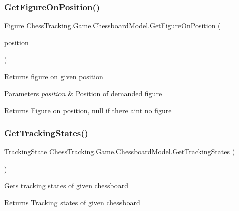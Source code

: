 \subsubsection{\texorpdfstring{GetFigureOnPosition()}{GetFigureOnPosition()}}
{\footnotesize\ttfamily \mbox{\hyperlink{class_chess_tracking_1_1_game_1_1_figure}{Figure}} Chess\+Tracking.\+Game.\+Chessboard\+Model.\+Get\+Figure\+On\+Position (\begin{DoxyParamCaption}\item[{\mbox{\hyperlink{class_chess_tracking_1_1_game_1_1_chess_position}{Chess\+Position}}}]{position }\end{DoxyParamCaption})}



Returns figure on given position 


\begin{DoxyParams}{Parameters}
{\em position} & Position of demanded figure\\
\hline
\end{DoxyParams}
\begin{DoxyReturn}{Returns}
\mbox{\hyperlink{class_chess_tracking_1_1_game_1_1_figure}{Figure}} on position, null if there ain\textquotesingle{}t no figure
\end{DoxyReturn}
\mbox{\label{class_chess_tracking_1_1_game_1_1_chessboard_model_a7dba1550cc252450505f388ad10ebffd}} 
\subsubsection{\texorpdfstring{GetTrackingStates()}{GetTrackingStates()}}
{\footnotesize\ttfamily \mbox{\hyperlink{class_chess_tracking_1_1_multithreading_messages_1_1_tracking_state}{Tracking\+State}} Chess\+Tracking.\+Game.\+Chessboard\+Model.\+Get\+Tracking\+States (\begin{DoxyParamCaption}{ }\end{DoxyParamCaption})}



Gets tracking states of given chessboard 

\begin{DoxyReturn}{Returns}
Tracking states of given chessboard
\end{DoxyReturn}
\mbox{\label{class_chess_tracking_1_1_game_1_1_chessboard_model_a86d722a1525231eb7133323b7bf021c5}} 
